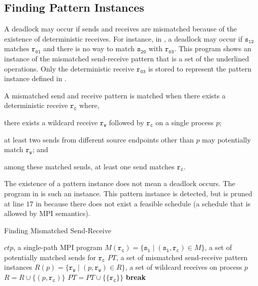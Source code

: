 \subsection{Finding Pattern Instances}

A deadlock may occur if sends and receives are mismatched because of the existence of deterministic receives. For instance, in , a deadlock may occur if $\mathtt{s_{12}}$ matches $\mathtt{r_{01}}$ and there is no way to match $\mathtt{s_{20}}$ with $\mathtt{r_{03}}$. This program shows an instance of the mismatched send-receive pattern that is a set of the underlined operations. Only the deterministic receive $\mathtt{r_{03}}$ is stored to represent the pattern instance defined in .


\begin{definition}
A mismatched send and receive pattern is matched when there exists a deterministic receive $\mathtt{r_c}$ where, 
\begin{compactenum}
\item there exists a wildcard receive $\mathtt{r_w}$ followed by $\mathtt{r_c}$ on a single process $\mathit{p}$; 
\item at least two sends from different source endpoints other than $\mathit{p}$ may potentially match $\mathtt{r_w}$; and
\item among these matched sends, at least one send matches $\mathtt{r_c}$. 
\end{compactenum}
\label{def:mismatch}
\end{definition}

\examplefigtwo

The existence of a pattern instance does not mean a deadlock occurs. The program in  is such an instance. This pattern instance is detected, but is pruned at line $17$ in  because there does not exist a feasible schedule (a schedule that is allowed by MPI semantics).



\begin{algorithm}
\caption{Finding Mismatched Send-Receive}\label{algo:mismatch}
\begin{algorithmic}[1]
\Require $\mathit{ctp}$, a single-path MPI program
\Require $\mathit{M}(\mathtt{r_c}) = \{\mathtt{s_l}\mid(\mathtt{s_l},\mathtt{r_c})\in\mathit{M}\}$, a set of potentially matched sends for $\mathtt{r_c}$
\State $\mathit{PT}$, a set of mismatched send-receive pattern instances
\State $\mathit{R}(p) = \{\mathtt{r_w}\mid(p,\mathtt{r_w})\in\mathit{R}\}$, a set of wildcard receives on process $p$
\State $\mathit{R} = \mathit{R} \cup \{(p,\mathtt{r_c})\}$
\EndIf
{}
\State $\mathit{PT} = \mathit{PT} \cup \{\{\mathtt{r_c}\}\}$
\State \textbf{break}
\EndIf
\EndFor
\EndIf
\EndFor
\EndFor
\end{algorithmic}
\end{algorithm}


